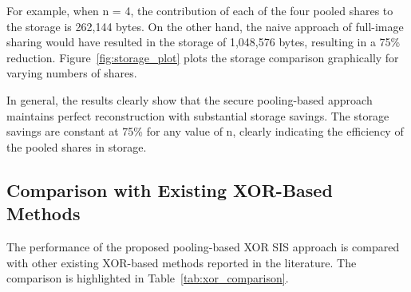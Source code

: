 For example, when n = 4, the contribution of each of the four pooled shares to the storage is 262,144 bytes. On the other hand, the naive approach of full-image sharing would have resulted in the storage of 1,048,576 bytes, resulting in a 75\% reduction. Figure~\ref{fig:storage_plot} plots the storage comparison graphically for varying numbers of shares.

In general, the results clearly show that the secure pooling-based approach maintains perfect reconstruction with substantial storage savings. The storage savings are constant at 75\% for any value of n, clearly indicating the efficiency of the pooled shares in storage.

\subsection{Comparison with Existing XOR-Based Methods}

The performance of the proposed pooling-based XOR SIS approach is compared with other existing XOR-based methods reported in the literature. The comparison is highlighted in Table~\ref{tab:xor_comparison}.

\begin{table}[htbp]
\centering
\caption{Comparison between a few XOR-based SIS schemes}
\label{tab:xor_comparison}
\end{table}

